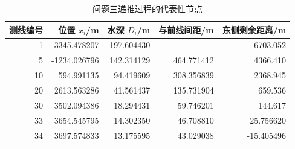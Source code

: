 \begin{table}[H]
\centering
\caption{问题三递推过程的代表性节点}
\label{tab:p3-samples}
\begin{tabular}{rrrrr}
\toprule
测线编号 & 位置 $x_i$/m & 水深 $D_i$/m & 与前线间距/m & 东侧剩余距离/m \\
\midrule
1 & -3345.478207 & 197.604430 & -- & 6703.052 \\
5 & -1234.026796 & 142.314129 & 464.771412 & 4366.410 \\
10 & 594.991135 & 94.419609 & 308.356839 & 2368.945 \\
20 & 2613.563286 & 41.561437 & 135.731904 & 659.536 \\
30 & 3502.094386 & 18.294431 & 59.746201 & 144.617 \\
33 & 3654.545795 & 14.302350 & 46.708810 & 25.756620 \\
34 & 3697.574833 & 13.175595 & 43.029038 & -15.405496 \\
\bottomrule
\end{tabular}
\end{table}

\clearpage
